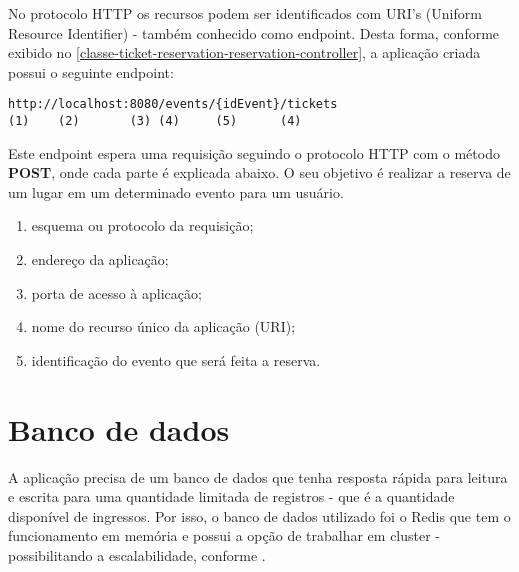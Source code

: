 No protocolo HTTP os recursos podem ser identificados com
URI's (Uniform Resource Identifier) - também conhecido como endpoint.
Desta forma, conforme exibido no \autoref{classe-ticket-reservation-reservation-controller},
a aplicação criada possui o seguinte endpoint:

\begin{minipage}{\linewidth}
\begin{lstlisting}[basicstyle=\ttfamily]
http://localhost:8080/events/{idEvent}/tickets
(1)    (2)       (3) (4)     (5)      (4)
\end{lstlisting}
\end{minipage}

Este endpoint espera uma requisição seguindo o protocolo HTTP
com o método \textbf{POST}, onde cada parte é explicada abaixo. O seu objetivo é
realizar a reserva de um lugar em um determinado evento para um usuário.

\begin{enumerate}

  \item esquema ou protocolo da requisição;

  \item endereço da aplicação;

  \item porta de acesso à aplicação;

  \item nome do recurso único da aplicação (URI);

  \item identificação do evento que será feita a reserva.

\end{enumerate}

\section{Banco de dados}\label{banco-de-dados}

A aplicação precisa de um banco de dados que tenha resposta rápida para leitura e
escrita para uma quantidade limitada de registros - que é a quantidade disponível
de ingressos. Por isso, o banco de dados utilizado foi o Redis que tem o funcionamento
em memória e possui a opção de trabalhar em cluster - possibilitando a escalabilidade,
conforme .


